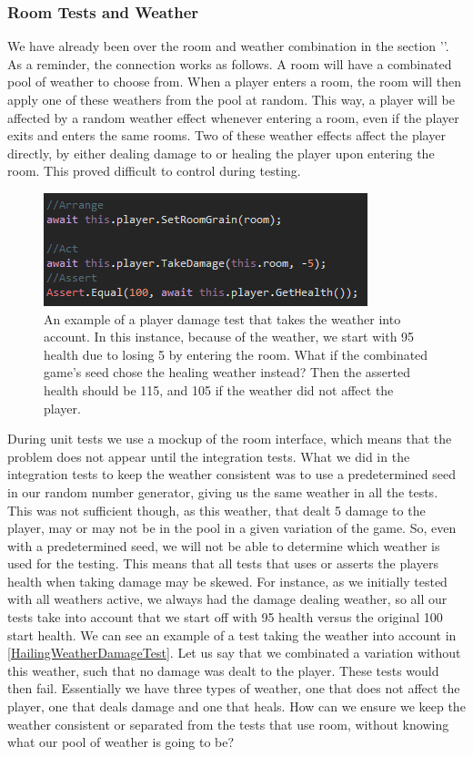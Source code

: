 \subsubsection{Room Tests and Weather} \label{roomTestsWeather}
We have already been over the room and weather combination in the section ''. As a reminder, the connection works as follows. A room will have a combinated pool of weather to choose from. When a player enters a room, the room will then apply one of these weathers from the pool at random. This way, a player will be affected by a random weather effect whenever entering a room, even if the player exits and enters the same rooms. Two of these weather effects affect the player directly, by either dealing damage to or healing the player upon entering the room. This proved difficult to control during testing. \\
\begin{figure}[h]
    \centering
    \includegraphics[width=0.5\linewidth]{Materials/TestingDiscussion/HailingWeatherDamageTest}
    \caption{An example of a player damage test that takes the weather into account. In this instance, because of the weather, we start with 95 health due to losing 5 by entering the room. What if the combinated game's seed chose the healing weather instead? Then the asserted health should be 115, and 105 if the weather did not affect the player.}
    \label{HailingWeatherDamageTest}
\end{figure}
During unit tests we use a mockup of the room interface, which means that the problem does not appear until the integration tests. What we did in the integration tests to keep the weather consistent was to use a predetermined seed in our random number generator, giving us the same weather in all the tests. This was not sufficient though, as this weather, that dealt 5 damage to the player, may or may not be in the pool in a given variation of the game. So, even with a predetermined seed, we will not be able to determine which weather is used for the testing. This means that all tests that uses or asserts the players health when taking damage may be skewed. For instance, as we initially tested with all weathers active, we always had the damage dealing weather, so all our tests take into account that we start off with 95 health versus the original 100 start health. We can see an example of a test taking the weather into account in \autoref{HailingWeatherDamageTest}. Let us say that we combinated a variation without this weather, such that no damage was dealt to the player. These tests would then fail. Essentially we have three types of weather, one that does not affect the player, one that deals damage and one that heals. How can we ensure we keep the weather consistent or separated from the tests that use room, without knowing what our pool of weather is going to be?  \\

